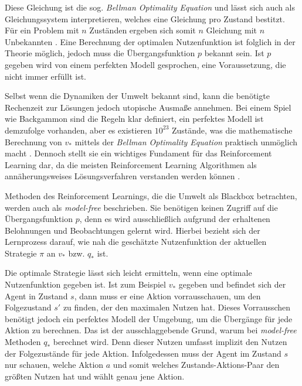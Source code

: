 Diese Gleichung ist die sog. \textit{Bellman Optimality Equation} und lässt sich auch als Gleichungssystem interpretieren, welches eine Gleichung pro Zustand bestitzt. Für ein Problem mit $n$ Zuständen ergeben sich somit $n$ Gleichung mit $n$ Unbekannten \cite[S.~63]{Sutton1998}. Eine Berechnung der optimalen Nutzenfunktion ist folglich in der Theorie möglich, jedoch muss die Übergangsfunktion $p$ bekannt sein. Ist $p$ gegeben wird von einem perfekten Modell gesprochen, eine Voraussetzung, die nicht immer erfüllt ist.
\par 
Selbst wenn die Dynamiken der Umwelt bekannt sind, kann die benötigte Rechenzeit zur Lösungen jedoch utopische Ausmaße annehmen. Bei einem Spiel wie \glqq Backgammon\grqq{} sind die Regeln klar definiert, ein perfektes Modell ist demzufolge vorhanden, aber es existieren $10^{23}$ Zustände, was die mathematische Berechnung von $v_*$ mittels der \textit{Bellman Optimality Equation} praktisch unmöglich macht \cite[S.~66]{Sutton1998}. Dennoch stellt sie ein wichtiges Fundament für das Reinforcement Learning dar, da die meisten Reinforcement Learning Algorithmen als annäherungsweises Lösungsverfahren verstanden werden können \cite[S.~66]{Sutton1998}. 
\par 
Methoden des Reinforcement Learnings, die die Umwelt als Blackbox betrachten, werden auch als \textit{model-free} beschrieben. Sie benötigen keinen Zugriff auf die Übergangsfunktion $p$, denn es wird ausschließlich aufgrund der erhaltenen Belohnungen und Beobachtungen gelernt wird. Hierbei bezieht sich der Lernprozess darauf, wie nah die geschätzte Nutzenfunktion der aktuellen Strategie $\pi$ an $v_*$ bzw. $q_*$ ist.
\par 
Die optimale Strategie lässt sich leicht ermitteln, wenn eine optimale Nutzenfunktion gegeben ist. Ist zum Beispiel $v_*$ gegeben und befindet sich der Agent in Zustand $s$, dann muss er eine Aktion vorrausschauen, um den Folgezustand $s'$ zu finden, der den maximalen Nutzen hat. Dieses Vorrausschen benötigt jedoch ein perfektes Modell der Umgebung, um die Übergänge für jede Aktion zu berechnen. Das ist der ausschlaggebende Grund, warum bei \textit{model-free} Methoden $q_*$ berechnet wird. Denn dieser Nutzen umfasst implizit den Nutzen der Folgezustände für jede Aktion. Infolgedessen muss der Agent im Zustand $s$ nur schauen, welche Aktion $a$ und somit welches Zustands-Aktions-Paar den größten Nutzen hat und wählt genau jene Aktion.
\par 

\par 